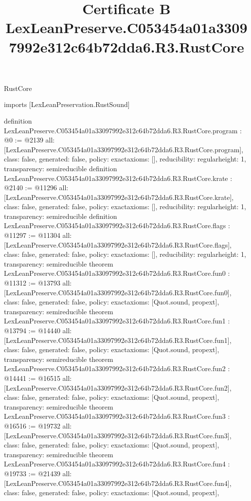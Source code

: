 \begin{lexlean}{RustCore}
\title{Certificate B LexLeanPreserve.C053454a01a33097992e312c64b72dda6.R3.RustCore}
\begin{coremodule}
imports [LexLeanPreservation.RustSound]

definition LexLeanPreserve.C053454a01a33097992e312c64b72dda6.R3.RustCore.program : @0 := @2139 {
  all: [LexLeanPreserve.C053454a01a33097992e312c64b72dda6.R3.RustCore.program],
  class: false,
  generated: false,
  policy: exact{axioms: []},
  reducibility: regular{height: 1},
  transparency: semireducible
}
definition LexLeanPreserve.C053454a01a33097992e312c64b72dda6.R3.RustCore.krate : @2140 := @11296 {
  all: [LexLeanPreserve.C053454a01a33097992e312c64b72dda6.R3.RustCore.krate],
  class: false,
  generated: false,
  policy: exact{axioms: []},
  reducibility: regular{height: 1},
  transparency: semireducible
}
definition LexLeanPreserve.C053454a01a33097992e312c64b72dda6.R3.RustCore.flags : @11297 := @11304 {
  all: [LexLeanPreserve.C053454a01a33097992e312c64b72dda6.R3.RustCore.flags],
  class: false,
  generated: false,
  policy: exact{axioms: []},
  reducibility: regular{height: 1},
  transparency: semireducible
}
theorem LexLeanPreserve.C053454a01a33097992e312c64b72dda6.R3.RustCore.fun0 : @11312 := @13793 {
  all: [LexLeanPreserve.C053454a01a33097992e312c64b72dda6.R3.RustCore.fun0],
  class: false,
  generated: false,
  policy: exact{axioms: [Quot.sound, propext]},
  transparency: semireducible
}
theorem LexLeanPreserve.C053454a01a33097992e312c64b72dda6.R3.RustCore.fun1 : @13794 := @14440 {
  all: [LexLeanPreserve.C053454a01a33097992e312c64b72dda6.R3.RustCore.fun1],
  class: false,
  generated: false,
  policy: exact{axioms: [Quot.sound, propext]},
  transparency: semireducible
}
theorem LexLeanPreserve.C053454a01a33097992e312c64b72dda6.R3.RustCore.fun2 : @14441 := @16515 {
  all: [LexLeanPreserve.C053454a01a33097992e312c64b72dda6.R3.RustCore.fun2],
  class: false,
  generated: false,
  policy: exact{axioms: [Quot.sound, propext]},
  transparency: semireducible
}
theorem LexLeanPreserve.C053454a01a33097992e312c64b72dda6.R3.RustCore.fun3 : @16516 := @19732 {
  all: [LexLeanPreserve.C053454a01a33097992e312c64b72dda6.R3.RustCore.fun3],
  class: false,
  generated: false,
  policy: exact{axioms: [Quot.sound, propext]},
  transparency: semireducible
}
theorem LexLeanPreserve.C053454a01a33097992e312c64b72dda6.R3.RustCore.fun4 : @19733 := @21439 {
  all: [LexLeanPreserve.C053454a01a33097992e312c64b72dda6.R3.RustCore.fun4],
  class: false,
  generated: false,
  policy: exact{axioms: [Quot.sound, propext]},
}
\end{coremodule}
\end{lexlean}
